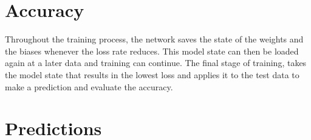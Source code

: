 \section{Accuracy}
Throughout the training process, the network saves the state of the weights and the biases whenever the loss rate reduces. This model state can then be loaded again at a later data and training can continue. The final stage of training, takes the model state that results in the lowest loss and applies it to the test data to make a prediction and evaluate the accuracy.
\section{Predictions}



